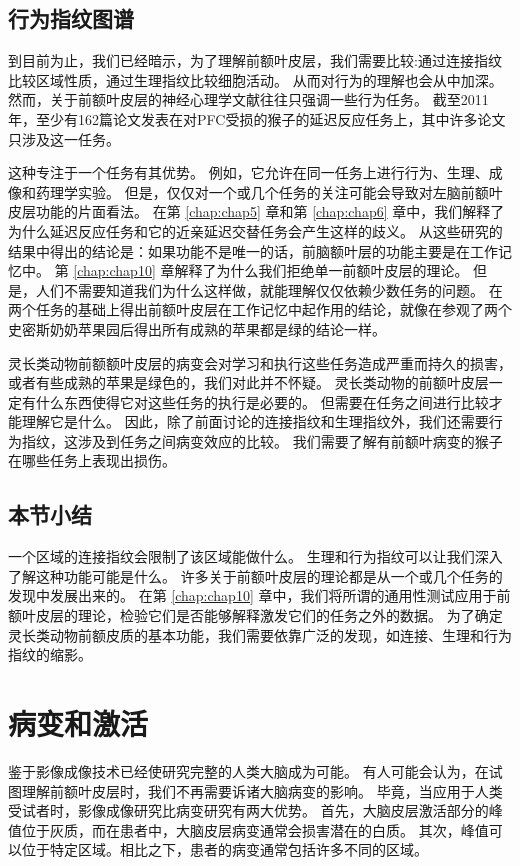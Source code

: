 \subsection{行为指纹图谱}
到目前为止，我们已经暗示，为了理解前额叶皮层，我们需要比较:通过连接指纹比较区域性质，通过生理指纹比较细胞活动。
从而对行为的理解也会从中加深。
然而，关于前额叶皮层的神经心理学文献往往只强调一些行为任务。
截至2011年，至少有162篇论文发表在对PFC受损的猴子的延迟反应任务上，其中许多论文只涉及这一任务。

\par
这种专注于一个任务有其优势。
例如，它允许在同一任务上进行行为、生理、成像和药理学实验。
但是，仅仅对一个或几个任务的关注可能会导致对左脑前额叶皮层功能的片面看法。
在第 \ref{chap:chap5} 章和第 \ref{chap:chap6} 章中，我们解释了为什么延迟反应任务和它的近亲延迟交替任务会产生这样的歧义。
从这些研究的结果中得出的结论是：如果功能不是唯一的话，前脑额叶层的功能主要是在工作记忆中。
第 \ref{chap:chap10} 章解释了为什么我们拒绝单一前额叶皮层的理论。
但是，人们不需要知道我们为什么这样做，就能理解仅仅依赖少数任务的问题。
在两个任务的基础上得出前额叶皮层在工作记忆中起作用的结论，就像在参观了两个史密斯奶奶苹果园后得出所有成熟的苹果都是绿的结论一样。
\par
灵长类动物前额额叶皮层的病变会对学习和执行这些任务造成严重而持久的损害，或者有些成熟的苹果是绿色的，我们对此并不怀疑。
灵长类动物的前额叶皮层一定有什么东西使得它对这些任务的执行是必要的。
但需要在任务之间进行比较才能理解它是什么。
因此，除了前面讨论的连接指纹和生理指纹外，我们还需要行为指纹，这涉及到任务之间病变效应的比较。
我们需要了解有前额叶病变的猴子在哪些任务上表现出损伤。


\subsection{本节小结}
一个区域的连接指纹会限制了该区域能做什么。
生理和行为指纹可以让我们深入了解这种功能可能是什么。
许多关于前额叶皮层的理论都是从一个或几个任务的发现中发展出来的。
在第 \ref{chap:chap10} 章中，我们将所谓的通用性测试应用于前额叶皮层的理论，检验它们是否能够解释激发它们的任务之外的数据。
为了确定灵长类动物前额皮质的基本功能，我们需要依靠广泛的发现，如连接、生理和行为指纹的缩影。


\section{病变和激活}
鉴于影像成像技术已经使研究完整的人类大脑成为可能。
有人可能会认为，在试图理解前额叶皮层时，我们不再需要诉诸大脑病变的影响。
毕竟，当应用于人类受试者时，影像成像研究比病变研究有两大优势。
首先，大脑皮层激活部分的峰值位于灰质，而在患者中，大脑皮层病变通常会损害潜在的白质。
其次，峰值可以位于特定区域。相比之下，患者的病变通常包括许多不同的区域。


